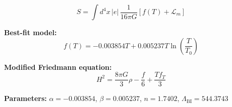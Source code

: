 
\begin{equation}
  S = \int d^4x \, |e| \, \frac{1}{16\pi G} \left[ f(T) + \mathcal{L}_m \right]
\end{equation}

\textbf{Best-fit model:}
\begin{equation}
  f(T) = -0.003854 T + 0.005237 T \ln\!\left(\frac{T}{T_0}\right)
\end{equation}

\textbf{Modified Friedmann equation:}
\begin{equation}
  H^2 = \frac{8\pi G}{3} \rho - \frac{f}{6} + \frac{T f_T}{3}
\end{equation}

\textbf{Parameters:}
$\alpha = -0.003854$, \quad
$\beta = 0.005237$, \quad
$n = 1.7402$, \quad
$\Lambda_{\text{BI}} = 544.3743$